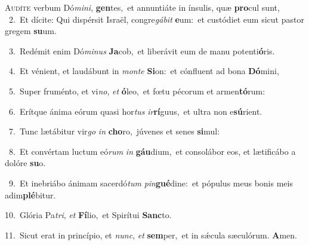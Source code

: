 \lettrine{\initial\textcolor{\initialcolor}{A}}{udíte} verbum Dó\-\textit{mi}\-\textit{ni}, \textbf{gen}\-tes,~\star et annuntiáte in ínsulis, quæ \textbf{pro}\-cul sunt,\\
{\numbfont\textcolor{\numbcolor}{~2.}}~Et dícite: Qui dispérsit Israël, congre\-\textit{gá}\-\textit{bit} \textbf{e}\-um:~\star et custódiet eum sicut pastor gregem \textbf{su}\-um.\par
{\numbfont\textcolor{\numbcolor}{~3.}}~Redémit enim Dó\-\textit{mi}\-\textit{nus} \textbf{Ja}\-cob,~\star et liberávit eum de manu potenti\-\textbf{ó}\-ris.\par
{\numbfont\textcolor{\numbcolor}{~4.}}~Et vénient, et laudábunt in \textit{mon}\-\textit{te} \textbf{Si}\-on:~\star et cónfluent ad bona \textbf{Dó}\-mini,\par
{\numbfont\textcolor{\numbcolor}{~5.}}~Super fruménto, et vi\-\textit{no}\-, \textit{et} \textbf{ó}\-leo,~\star et fœtu pécorum et armen\-\textbf{tó}\-rum:\par
{\numbfont\textcolor{\numbcolor}{~6.}}~Erítque ánima eórum quasi hor\textit{tus} \textit{ir}\-\textbf{rí}guus,~\star et ultra non e\-\textbf{sú}\-rient.\par
{\numbfont\textcolor{\numbcolor}{~7.}}~Tunc lætábitur vir\textit{go} \textit{in} \textbf{cho}\-ro,~\star júvenes et senes \textbf{si}\-mul:\par
{\numbfont\textcolor{\numbcolor}{~8.}}~Et convértam luctum eó\textit{rum} \textit{in} \textbf{gáu}\-dium,~\star et consolábor eos, et lætificábo a dolóre \textbf{su}\-o.\par
{\numbfont\textcolor{\numbcolor}{~9.}}~Et inebriábo ánimam sacerdó\textit{tum} \textit{pin}\-\textbf{gué}dine:~\star et pópulus meus bonis meis adim\-\textbf{plé}\-bitur.\par
{\numbfont\textcolor{\numbcolor}{10.}}~Glória Pa\-\textit{tri}\-, \textit{et} \textbf{Fí}\-lio,~\star et Spirítui \textbf{Sanc}\-to.\par
{\numbfont\textcolor{\numbcolor}{11.}}~Sicut erat in princípio, et \textit{nunc}\-, \textit{et} \textbf{sem}\-per,~\star et in sǽcula sæculórum. \textbf{A}\-men.\par
